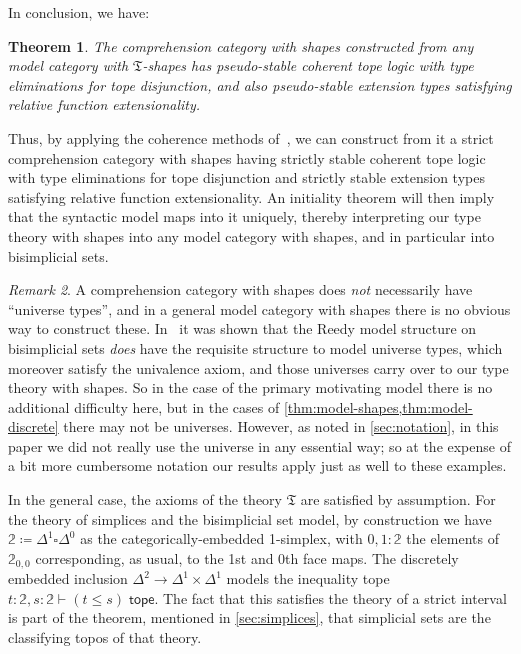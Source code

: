 \documentclass{amsart}
\theoremstyle{plain}
\newtheorem{thm}{Theorem}[section]
\theoremstyle{definition}
\theoremstyle{remark}
\newtheorem{rmk}[thm]{Remark}
\numberwithin{equation}{section}
\newcommand{\defeq}{\coloneqq}
\newcommand{\types}{\vdash}
\newcommand{\tope}{\;\mathsf{tope}}
\newcommand{\two}{\mathbb{2}}
\newcommand{\fT}{\mathfrak{T}}
\begin{document}
In conclusion, we have:

\begin{thm}
  The comprehension category with shapes constructed from any model category with $\fT$-shapes has pseudo-stable coherent tope logic with type eliminations for tope disjunction, and also pseudo-stable extension types satisfying relative function extensionality.
\end{thm}

Thus, by applying the coherence methods of~\cite{LW}, we can construct from it a strict comprehension category with shapes having strictly stable coherent tope logic with type eliminations for tope disjunction and strictly stable extension types satisfying relative function extensionality.
An initiality theorem will then imply that the syntactic model maps into it uniquely, thereby interpreting our type theory with shapes into any model category with shapes, and in particular into bisimplicial sets.

\begin{rmk}
  A comprehension category with shapes does \emph{not} necessarily have ``universe types'', and in a general model category with shapes there is no obvious way to construct these.
  In~\cite{elreedy} it was shown that the Reedy model structure on bisimplicial sets \emph{does} have the requisite structure to model universe types, which moreover satisfy the univalence axiom, and those universes carry over to our type theory with shapes.
  So in the case of the primary motivating model there is no additional difficulty here, but in the cases of \cref{thm:model-shapes,thm:model-discrete} there may not be universes.
  However, as noted in \cref{sec:notation}, in this paper we did not really use the universe in any essential way; so at the expense of a bit more cumbersome notation our results apply just as well to these examples.
\end{rmk}

In the general case, the axioms of the theory $\fT$ are satisfied by assumption.
For the theory of simplices and the bisimplicial set model, by construction we have $\two \defeq \Delta^1 \square \Delta^0$ as the categorically-embedded 1-simplex, with $0,1 : \two$ the elements of $\two_{0,0}$ corresponding, as usual, to the 1st and 0th face maps.
The discretely embedded inclusion $\Delta^2 \to \Delta^1\times \Delta^1$ models the inequality tope $t :\two,s:\two \types (t \leq s) \tope$.
The fact that this satisfies the theory of a strict interval is part of the theorem, mentioned in \cref{sec:simplices}, that simplicial sets are the classifying topos of that theory.
\end{document}
